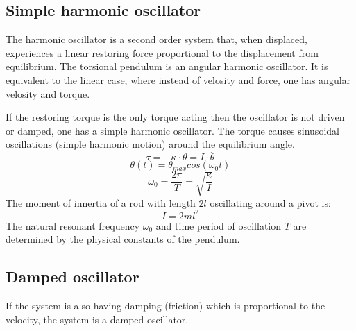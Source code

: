 \documentclass[\main/master.tex]{subfiles}
\begin{document}
\subsection{Simple harmonic oscillator}
The harmonic oscillator is a second order system that, when displaced, experiences a linear restoring force proportional to the displacement from equilibrium. The torsional pendulum is an angular harmonic oscillator. It is equivalent to the linear case, where instead of velosity and force, one has angular velosity and torque.
\par\noindent
If the restoring torque is the only torque acting then the oscillator is not driven or damped, one has a simple harmonic oscillator. The torque causes sinusoidal oscillations (simple harmonic motion) around the equilibrium angle.  
\begin{equation}
\tau = -\kappa\cdot\theta  = I\cdot\ddot{\theta}   \label{eqn:undamped_motion_equation}
\end{equation}
\begin{equation}
\theta(t) = \theta_{max}cos(\omega_0 t )    \label{eqn:undamped_motion_equation}
\end{equation}
\begin{equation}
\omega_0  = \frac{2\pi}{T} = \sqrt{\frac{\kappa}{I}}   \label{eqn:undamped_motion_equation}
\end{equation}
The moment of innertia of a rod with length $2l$ oscillating around a pivot is:
\begin{equation}
I = 2ml^2     \label{eqn:moment_innertia}
\end{equation}  
The natural resonant frequency $\omega_0$ and time period of oscillation $T$ are determined by the physical constants of the pendulum.


\subsection{Damped oscillator}
If the system is also having damping (friction) which is proportional to the velocity, the system is a damped oscillator.
\end{document}
